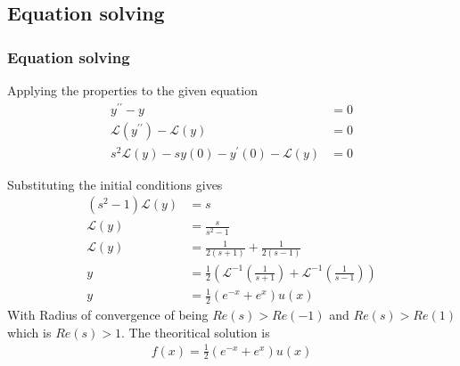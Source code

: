 \documentclass{beamer}
\providecommand{\brak}[1]{\ensuremath{\left(#1\right)}}
\theoremstyle{remark}
\numberwithin{equation}{section}
\begin{document}
\subsection{Equation solving}
\begin{frame}
\frametitle{Equation solving}
Applying the properties to the given equation
\begin{align}
	y^{\prime\prime} - y &= 0\\
	\mathcal{L}\brak{y^{\prime\prime}} - \mathcal{L}\brak{y} &= 0\\
	s^2\mathcal{L}\brak{y} -sy\brak{0}-y^\prime\brak{0}-\mathcal{L}\brak{y} &= 0
\end{align}
\end{frame}
\begin{frame}
Substituting the initial conditions gives
\begin{align}
	\brak{s^2-1}\mathcal{L}\brak{y}&= s\\
	\mathcal{L}\brak{y} &= \frac{s}{s^2 - 1}\\
	 \mathcal{L}\brak{y} &= \frac{1}{2\brak{s+1}}+\frac{1}{2\brak{s-1}}\\
	y &= \frac{1}{2}\brak{\mathcal{L}^{-1}\brak{\frac{1}{s+1}}+\mathcal{L}^{-1}\brak{\frac{1}{s-1}}}\\
	y &= \frac{1}{2}\brak{e^{-x}+e^{x}}u\brak{x}
\end{align}
With Radius of convergence of being $Re\brak{s}>Re\brak{-1}$ and $Re\brak{s}>Re\brak{1}$ which is $Re\brak{s}>1$.\newline
The theoritical solution is 
\begin{align}
	f\brak{x} = \frac{1}{2}\brak{e^{-x}+e^{x}}u\brak{x}
\end{align}
\end{frame}
\end{document}
